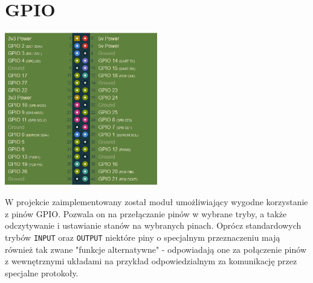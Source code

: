 \documentclass[shortabstract]{iithesis}
\begin{document}
\section{GPIO}
\begingroup
\centering
\includegraphics[width=0.5\textwidth]{gpio.png}
\endgroup

W projekcie zaimplementowany został moduł umożliwiający wygodne korzystanie z pinów GPIO. Pozwala on na przełączanie pinów w wybrane tryby, a także odczytywanie i ustawianie stanów na wybranych pinach. Oprócz standardowych trybów \texttt{INPUT} oraz \texttt{OUTPUT} niektóre piny o specjalnym przeznaczeniu mają również tak zwane "funkcje alternatywne" - odpowiadają one za połączenie pinów z wewnętrznymi układami na przykład odpowiedzialnym za komunikację przez specjalne protokoły.
\end{document}
